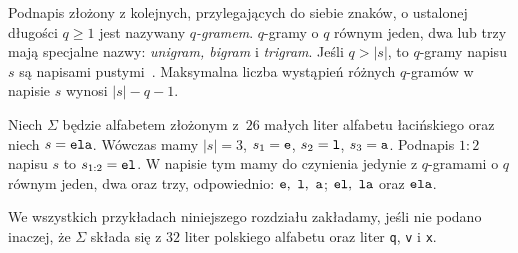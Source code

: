 \documentclass{praca1}
\begin{document}
\begin{definition}
Podnapis złożony z kolejnych, przylegających do siebie znaków, o ustalonej długości $q\geq 1$ jest nazywany \emph{$q$-gramem}. $q$-gramy o $q$ równym jeden, dwa lub trzy mają specjalne nazwy: \emph{unigram, bigram} i \emph{trigram}. Jeśli $q > |s|$, to $q$-gramy napisu $s$ są napisami pustymi~\cite{Boytsov2011:indexingmethods}. Maksymalna liczba wystąpień różnych $q$-gramów w napisie $s$ wynosi $|s|-q-1$.
\end{definition}



\begin{example}
Niech $\Sigma$ będzie alfabetem złożonym z~$26$ małych liter alfabetu łacińskiego oraz niech $s = \verb|ela|$. Wówczas mamy $|s| = 3$, $s_1 = \verb|e|$, $s_2 = \verb|l|$, $s_3 = \verb|a|$. Podnapis $1\!\!:\!\!2$ napisu $s$ to $s_{1:2} = \verb|el|$. W napisie tym mamy do czynienia jedynie z $q$-gramami o $q$ równym jeden, dwa oraz trzy, odpowiednio: $\verb|e|,\ \verb|l|,\ \verb|a|$; $\verb|el|,\ \verb|la|$ oraz $\verb|ela|$.
\end{example}


We wszystkich przykładach niniejszego rozdziału zakładamy, jeśli nie podano inaczej, że $\Sigma$ składa się z $32$ liter polskiego alfabetu oraz liter \verb|q|, \verb|v| i \verb|x|.

\end{document}
